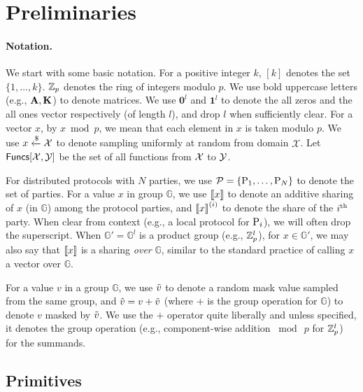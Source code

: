 
\section{Preliminaries}
\label{sec:preliminaries}

\paragraph{Notation.} We start with some basic notation.
For a positive integer $k$, $[k]$ denotes the set $\{1,\dots, k\}$. $\mathbb{Z}_p$ denotes the ring of integers modulo $p$. We use bold uppercase letters (e.g., $\mat{A}, \mat{K}$) to denote matrices. We use $\textbf{0}^l$ and $\textbf{1}^l$ to denote the all zeros and the all ones vector respectively (of length $l$), and drop $l$ when sufficiently clear. For a vector $x$, by $x \bmod p$, we mean that each element in $x$ is taken modulo $p$. We use $x \xleftarrow{\$} \mathcal{X}$ to denote sampling uniformly at random from domain $\mathcal{X}$. Let $\mathsf{Funcs}[\mathcal{X}, \mathcal{Y}]$ be the set of all functions from $\mathcal{X}$ to $\mathcal{Y}$.

For distributed protocols with $N$ parties, we use $\mathcal{P} = \{\textnormal{P}_1, \dots, \textnormal{P}_N\}$ to denote the set of parties. For a value $x$ in group $\mathbb{G}$, we use $\left\llbracket x \right\rrbracket$ to denote an additive sharing of $x$ (in $\mathbb{G}$) among the protocol parties, and $\left\llbracket x \right\rrbracket^{(i)}$ to denote the share of the $i^{\textnormal{th}}$ party. When clear from context (e.g., a local protocol for $\textnormal{P}_i$), we will often drop the superscript. When $\mathbb{G}' =  \mathbb{G}^l$ is a product group (e.g., $\mathbb{Z}_p^l$), for $x \in \mathbb{G}'$, we may also say that $\left\llbracket x \right\rrbracket$ is a sharing \textit{over} $\mathbb{G}$, similar to the standard practice of calling $x$ a vector over $\mathbb{G}$.

For a value $v$ in a group $\mathbb{G}$, we use $\tilde{v}$ to denote a random mask value sampled from the same group, and $\hat{v} = v + \tilde{v}$ (where + is the group operation for $\mathbb{G}$) to denote $v$ masked by $\tilde{v}$. We use the $+$ operator quite liberally and unless specified, it denotes the group operation (e.g., component-wise addition $\bmod~p$ for $\mathbb{Z}_p^l$) for the summands.


\subsection{Primitives}

